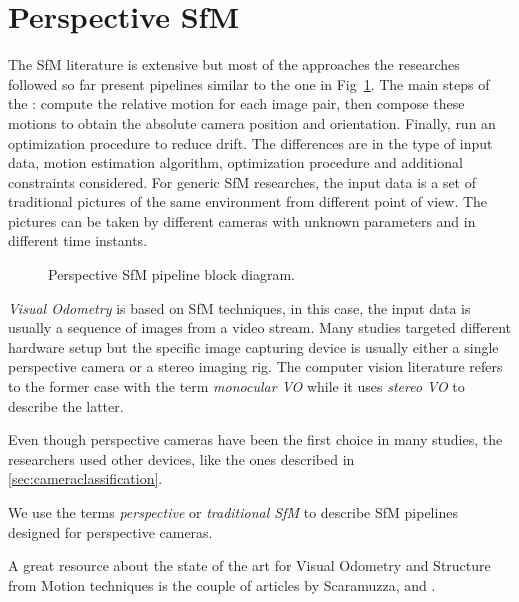 \section{Perspective SfM}
The SfM literature is extensive but most of the approaches the 
researches followed so far present pipelines similar to the one in 
Fig~\ref{fig:block_diagram}.
The main steps of the : compute the relative motion for each image
pair, then compose these motions to obtain the absolute camera position and 
orientation. Finally, run an optimization procedure to reduce drift.
The differences are in the type of input data, motion estimation algorithm,
optimization procedure and additional constraints considered.
For generic SfM researches, the input data is a set of traditional pictures of 
the same environment from different point of view. The pictures can be taken by 
different cameras with unknown parameters and in different time instants.
\begin{figure}
	\label{fig:block_diagram}
   \centering
    \def\svgwidth{0.5\columnwidth}
    
    \caption{Perspective SfM pipeline block diagram.}
\end{figure}
\textit{Visual Odometry} is based on SfM techniques, 
in this case, the input data is usually a sequence 
of images from a video stream. Many studies targeted different hardware setup 
but the specific image capturing device is usually either a single perspective 
camera or a stereo imaging rig. The computer vision literature refers to the
former case with the term \textit{monocular VO} while it uses \textit{stereo VO}
to describe the latter.

Even though perspective cameras have been the first choice in many studies, 
the researchers used other devices, like the ones described in 
\ref{sec:cameraclassification}.

We use the terms \textit{perspective} or \textit{traditional SfM} to describe 
SfM pipelines designed for perspective cameras.

A great resource about the state of the art for Visual Odometry and Structure 
from Motion techniques is the couple of articles by Scaramuzza,  
\cite{scaramuzzaVisualOdometryI} and \cite{scaramuzzaVisualOdometryII}.

